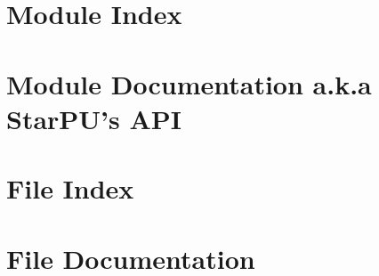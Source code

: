\chapter{Module Index}


\chapter{Module Documentation a.k.a StarPU's API}
\label{ModuleDocumentation}
\hypertarget{ModuleDocumentation}{}









































\chapter{File Index}


\chapter{File Documentation}
\label{FileDocumentation}
\hypertarget{FileDocumentation}{}

